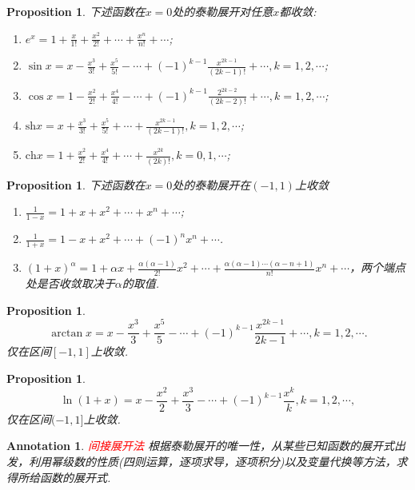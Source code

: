 \documentclass{article}
\newtheorem{proposition}[theorem]{Proposition}
\newtheorem{annotation}[theorem]{Annotation}
\newcommand{\redt}[1]{\textcolor{red}{#1}}
\begin{document}
\begin{proposition}
\rm 下述函数在$x=0$处的泰勒展开对任意$x$都收敛:
\begin{enumerate}
	\item $e^x = 1 + \frac{x}{1!} + \frac{x^2}{2!} + \cdots + \frac{x^n}{n!} + \cdots$;
	\item $\sin x = {x} - \frac{x^3}{3!} + \frac{x^5}{5!} - \cdots + (-1)^{k-1}\frac{x^{2k-1}}{(2k-1)!} + \cdots,k =1,2,\cdots$;
	\item $\cos x = 1 - \frac{x^2}{2!} +  \frac{x^4}{4!} - \cdots + (-1)^{k-1}\frac{2^{2k-2}}{(2k-2)!} + \cdots , k=1,2,\cdots$;
	\item $\text{sh} x = x + \frac{x^3}{3!} + \frac{x^5}{5!}+ \cdots + \frac{x^{2k-1}}{(2k-1)!}, k = 1,2,\cdots$;
	\item $\text{ch} x = 1 + \frac{x^2}{2!} + \frac{x^4}{4!}+ \cdots + \frac{x^{2k}}{(2k)!}, k =0,1,\cdots$;
\end{enumerate}
\end{proposition}

\begin{proposition}
\rm 下述函数在$x=0$处的泰勒展开在$(-1,1)$上收敛
\begin{enumerate}
	\item $\frac{1}{1-x} = 1+x+x^2+\cdots+x^n + \cdots$;
	\item $\frac{1}{1+x} = 1-x+x^2+\cdots+(-1)^nx^n + \cdots$.
	\item $(1+x)^\alpha = 1 + \alpha x+ \frac{\alpha(\alpha-1)}{2!}x^2 +  \cdots + \frac{\alpha(\alpha-1)\cdots(\alpha-n+1)}{n!}x^n+\cdots$，两个端点处是否收敛取决于$\alpha$的取值. 
\end{enumerate}
\end{proposition}

\begin{proposition}
\rm 
$$
\arctan x = x - \frac{x^3}{3} + \frac{x^5}{5} - \cdots + (-1)^{k-1}\frac{x^{2k-1}}{2k-1} + \cdots,k=1,2,\cdots.
$$
仅在区间$[-1,1]$上收敛. 
\end{proposition}

\begin{proposition}
\rm 
$$
\ln (1+x) = x-\frac{x^2}{2} + \frac{x^3}{3}- \cdots + (-1)^{k-1}\frac{x^k}{k},k=1,2,\cdots,
$$
仅在区间$(-1,1]$上收敛. 
\end{proposition}

\begin{annotation}
\rm \redt{间接展开法} 根据泰勒展开的唯一性，从某些已知函数的展开式出发，利用幂级数的性质(四则运算，逐项求导，逐项积分)以及变量代换等方法，求得所给函数的展开式.
\end{annotation}
\end{document}
